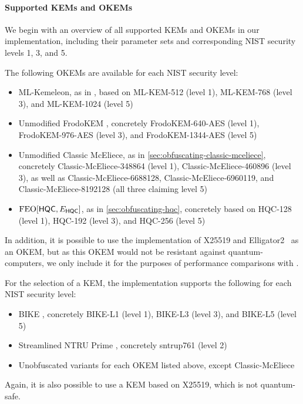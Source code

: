 \paragraph{Supported KEMs and OKEMs}
We begin with an overview of all supported KEMs and OKEMs in our implementation, including their parameter sets and corresponding NIST security levels 1, 3, and 5.

The following OKEMs are available for each NIST security level:
\begin{itemize}
    \item ML-Kemeleon, as in \cite{irtf-cfrg-kemeleon-00}, based on ML-KEM-512 (level 1), ML-KEM-768 (level 3), and ML-KEM-1024 (level 5)
    \item Unmodified FrodoKEM \cite{NISTPQC-R3:FrodoKEM20}, concretely FrodoKEM-640-AES (level 1), FrodoKEM-976-AES (level 3), and FrodoKEM-1344-AES (level 5)
    \item Unmodified Classic McEliece, as in \cref{sec:obfuscating-classic-mceliece}, concretely Classic-McEliece-348864 (level 1), Classic-McEliece-460896 (level 3), as well as Classic-McEliece-6688128, Classic-McEliece-6960119, and Classic-McEliece-8192128 (all three claiming level 5)
    \item $\textsf{\textnormal{FEO}}[\mathsf{HQC}, E_\mathsf{HQC}]$, as in \cref{sec:obfuscating-hqc}, concretely based on HQC-128 (level 1), HQC-192 (level 3), and HQC-256 (level 5)
\end{itemize}

In addition, it is possible to use the implementation of X25519 and \textsf{Elligator2}~\cite{CCS:BHKL13} as an OKEM, but as this OKEM would not be resistant against quantum-computers, we only include it for the purposes of performance comparisons with \obfsfour{}.

For the selection of a KEM, the implementation supports the following for each NIST security level:
\begin{itemize}
    \item BIKE \cite{NISTPQC-R4:BIKE22}, concretely BIKE-L1 (level 1), BIKE-L3 (level 3), and BIKE-L5 (level 5)
    \item Streamlined NTRU Prime \cite{NISTPQC-R3:NTRUPrime20}, concretely sntrup761 (level 2)
    \item Unobfuscated variants for each OKEM listed above, except Classic-McEliece
\end{itemize}

Again, it is also possible to use a KEM based on X25519, which is not quantum-safe.

